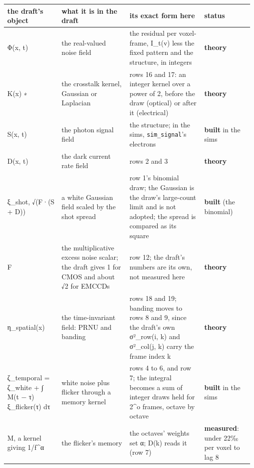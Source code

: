 {\footnotesize
\setlength{\tabcolsep}{6pt}
\begin{longtable}{>{\RaggedRight\arraybackslash}p{}>{\RaggedRight\arraybackslash}p{}>{\RaggedRight\arraybackslash}p{}>{\RaggedRight\arraybackslash}p{}}
\toprule
the draft's object & what it is in the draft & its exact form here & status \\
\midrule
\endhead
Φ(x, t) & the real-valued noise field & the residual per voxel-frame, I\_\allowbreak{}t(v) less the fixed pattern and the structure, in integers & \textbf{theory} \\
K(x) ∗ & the crosstalk kernel, Gaussian or Laplacian & rows 16 and 17: an integer kernel over a power of 2, before the draw (optical) or after it (electrical) & \textbf{theory} \\
S(x, t) & the photon signal field & the structure; in the sims, \texttt{sim\_\allowbreak{}signal}'s electrons & \textbf{built} in the sims \\
D(x, t) & the dark current rate field & rows 2 and 3 & \textbf{theory} \\
ξ\_\allowbreak{}shot, √(F·(S + D)) & a white Gaussian field scaled by the shot spread & row 1's binomial draw; the Gaussian is the draw's large-count limit and is not adopted; the spread is compared as its square & \textbf{built} (the binomial) \\
F & the multiplicative excess noise scalar; the draft gives 1 for CMOS and about √2 for EMCCDs & row 12; the draft's numbers are its own, not measured here & \textbf{theory} \\
η\_\allowbreak{}spatial(x) & the time-invariant field: PRNU and banding & rows 18 and 19; banding moves to rows 8 and 9, since the draft's own σ²\_\allowbreak{}row(i, k) and σ²\_\allowbreak{}col(j, k) carry the frame index k & \textbf{theory} \\
ζ\_\allowbreak{}temporal = ζ\_\allowbreak{}white + ∫ M(t − τ) ξ\_\allowbreak{}flicker(τ) dτ & white noise plus flicker through a memory kernel & rows 4 to 6, and row 7; the integral becomes a sum of integer draws held for 2\textasciicircum{}o frames, octave by octave & \textbf{built} in the sims \\
M, a kernel giving 1/f\textasciicircum{}α & the flicker's memory & the octaves' weights set α; D(k) reads it (row 7) & \textbf{measured}: under 22‰ per voxel to lag 8 \\

\end{longtable}}
